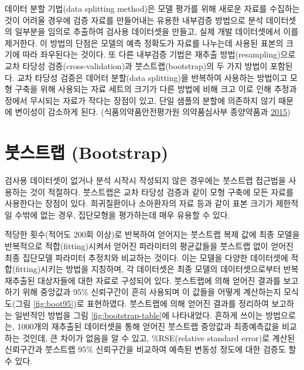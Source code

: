 \documentclass[
  11pt,
  krantz2, a4paper, twoside]{krantz}
\theoremstyle{definition}
\theoremstyle{definition}
\theoremstyle{definition}
\theoremstyle{remark}
\begin{document}
데이터 분할 기법(data splitting method)은 모델 평가를 위해 새로운 자료를 수집하는 것이 어려울 경우에 검증 자료를 만들어내는 유용한 내부검증 방법으로 분석 데이터셋의 일부분을 임의로 추출하여 검사용 데이터셋을 만들고, 실제 개발 데이터셋에서 이를 제거한다. 이 방법의 단점은 모델의 예측 정확도가 자료를 나누는데 사용된 표본의 크기에 따라 좌우된다는 것이다. 또 다른 내부검증 기법은 재추출 방법(resampling)으로 교차 타당성 검증(cross-validation)과 붓스트랩(bootstrap)의 두 가지 방법이 포함된다. 교차 타당성 검증은 데어터 분할(data splitting)을 반복하여 사용하는 방법이고 모형 구축을 위해 사용되는 자료 세트의 크기가 다른 방법에 비해 크고 이로 인해 추정과정에서 무시되는 자료가 작다는 장점이 있고, 단일 샘플의 분할에 의존하지 않기 때문에 변이성이 감소하게 된다. (식품의약품안전평가원 의약품심사부 종양약품과 \protect\hyperlink{ref-poppk}{2015})

\hypertarget{uxbd93uxc2a4uxd2b8uxb7a9-bootstrap}{%
\section{붓스트랩 (Bootstrap)}\label{uxbd93uxc2a4uxd2b8uxb7a9-bootstrap}}


검사용 데이터셋이 없거나 분석 시작시 작성되지 않은 경우에는 붓스트랩 접근법을 사용하는 것이 적절하다. 붓스트랩은 교차 타당성 검증과 같이 모형 구축에 모든 자료를 사용한다는 장점이 있다. 희귀질환이나 소아환자의 자료 등과 같이 표본 크기가 제한적일 수밖에 없는 경우, 집단모형을 평가하는데 매우 유용할 수 있다.

적당한 횟수(적어도 200회 이상)로 반복하여 얻어지는 붓스트랩 복제 값에 최종 모델을 반복적으로 적합(fitting)시켜서 얻어진 파라미터의 평균값들을 붓스트랩 없이 얻어진 최종 집단모델 파라미터 추정치와 비교하는 것이다. 이는 모델을 다양한 데이터셋에 적합(fitting)시키는 방법을 지칭하며, 각 데이터셋은 최종 모델의 데이터셋으로부터 반복 재추출된 대상자들에 대한 자료로 구성되어 있다. 붓스트랩에 의해 얻어진 결과를 보고하기 위해 중앙값과 95\% 신뢰구간이 흔히 사용되며 이 값들을 어떻게 계산하는지 모식도(그림 \ref{fig:boot95})로 표현하였다. 붓스트랩에 의해 얻어진 결과를 정리하여 보고하는 일반적인 방법을 그림 \ref{fig:bootstrap-table}에 나타내었다. 흔하게 쓰이는 방법으로는, 1000개의 재추출된 데이터셋을 통해 얻어진 붓스트랩 중앙값과 최종예측값을 비교하는 것인데, 큰 차이가 없음을 알 수 있고, \%RSE(relative standard error)로 계산된 신뢰구간과 붓스트랩 95\% 신뢰구간을 비교하여 예측된 변동성 정도에 대한 검증도 할 수 있다.
\end{document}
